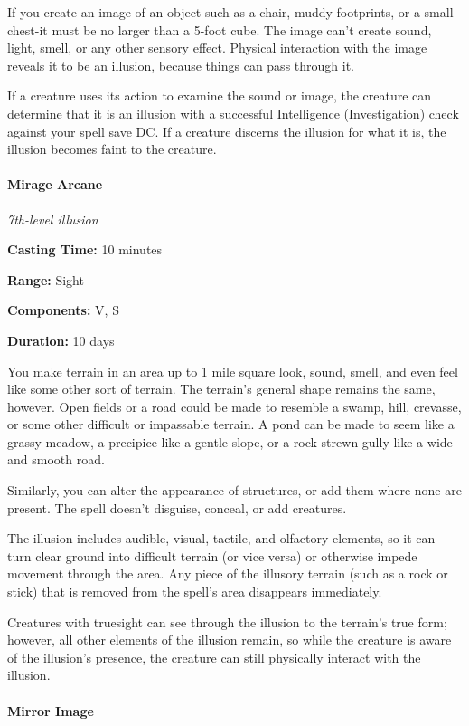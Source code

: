 \documentclass[
]{article}
\begin{document}
If you create an image of an object-such as a chair, muddy footprints,
or a small chest-it must be no larger than a 5-foot cube. The image
can't create sound, light, smell, or any other sensory effect. Physical
interaction with the image reveals it to be an illusion, because things
can pass through it.

If a creature uses its action to examine the sound or image, the
creature can determine that it is an illusion with a successful
Intelligence (Investigation) check against your spell save DC. If a
creature discerns the illusion for what it is, the illusion becomes
faint to the creature.

\hypertarget{mirage-arcane}{%
\paragraph{Mirage Arcane}\label{mirage-arcane}}

\emph{7th-level illusion}

\textbf{Casting Time:} 10 minutes

\textbf{Range:} Sight

\textbf{Components:} V, S

\textbf{Duration:} 10 days

You make terrain in an area up to 1 mile square look, sound, smell, and
even feel like some other sort of terrain. The terrain's general shape
remains the same, however. Open fields or a road could be made to
resemble a swamp, hill, crevasse, or some other difficult or impassable
terrain. A pond can be made to seem like a grassy meadow, a precipice
like a gentle slope, or a rock-strewn gully like a wide and smooth road.

Similarly, you can alter the appearance of structures, or add them where
none are present. The spell doesn't disguise, conceal, or add creatures.

The illusion includes audible, visual, tactile, and olfactory elements,
so it can turn clear ground into difficult terrain (or vice versa) or
otherwise impede movement through the area. Any piece of the illusory
terrain (such as a rock or stick) that is removed from the spell's area
disappears immediately.

Creatures with truesight can see through the illusion to the terrain's
true form; however, all other elements of the illusion remain, so while
the creature is aware of the illusion's presence, the creature can still
physically interact with the illusion.

\hypertarget{mirror-image}{%
\paragraph{Mirror Image}\label{mirror-image}}
\end{document}
